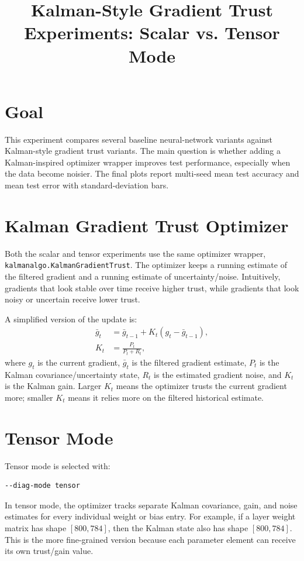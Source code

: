 \documentclass[11pt]{article}
\title{Kalman-Style Gradient Trust Experiments: Scalar vs. Tensor Mode}
\author{}
\date{}
\begin{document}
\maketitle

\section{Goal}

This experiment compares several baseline neural-network variants against Kalman-style gradient trust variants. The main question is whether adding a Kalman-inspired optimizer wrapper improves test performance, especially when the data become noisier. The final plots report multi-seed mean test accuracy and mean test error with standard-deviation bars.

\section{Kalman Gradient Trust Optimizer}

Both the scalar and tensor experiments use the same optimizer wrapper, \texttt{kalmanalgo.KalmanGradientTrust}. The optimizer keeps a running estimate of the filtered gradient and a running estimate of uncertainty/noise. Intuitively, gradients that look stable over time receive higher trust, while gradients that look noisy or uncertain receive lower trust.

A simplified version of the update is:
\begin{align*}
\bar{g}_t &= \bar{g}_{t-1} + K_t(g_t - \bar{g}_{t-1}), \\
K_t &= \frac{P_t}{P_t + R_t},
\end{align*}
where $g_t$ is the current gradient, $\bar{g}_t$ is the filtered gradient estimate, $P_t$ is the Kalman covariance/uncertainty state, $R_t$ is the estimated gradient noise, and $K_t$ is the Kalman gain. Larger $K_t$ means the optimizer trusts the current gradient more; smaller $K_t$ means it relies more on the filtered historical estimate.

\section{Tensor Mode}

Tensor mode is selected with:
\begin{lstlisting}
--diag-mode tensor
\end{lstlisting}

In tensor mode, the optimizer tracks separate Kalman covariance, gain, and noise estimates for every individual weight or bias entry. For example, if a layer weight matrix has shape $[800, 784]$, then the Kalman state also has shape $[800, 784]$. This is the more fine-grained version because each parameter element can receive its own trust/gain value.
\end{document}
